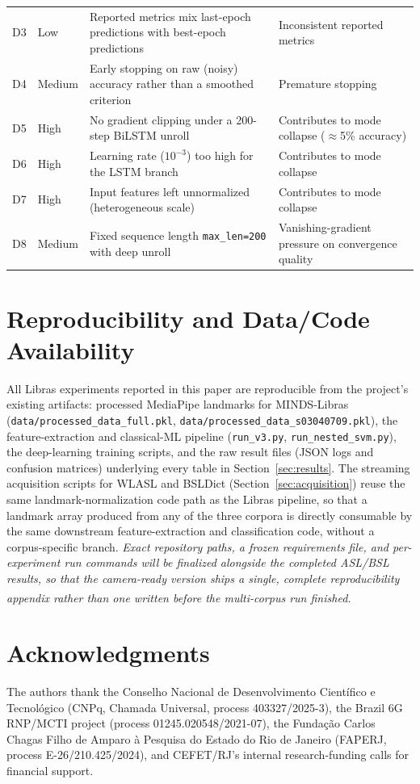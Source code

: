 \documentclass[journal]{IEEEtran}
\newcommand{\tbd}[1]{\textit{#1}\textsuperscript{\dag}}   %
\begin{document}
\begin{table}[t]
\begin{tabular}{clp{9.5cm}l}
D3 & Low & Reported metrics mix last-epoch predictions with best-epoch predictions & Inconsistent reported metrics \\
D4 & Medium & Early stopping on raw (noisy) accuracy rather than a smoothed criterion & Premature stopping \\
D5 & High & No gradient clipping under a 200-step BiLSTM unroll & Contributes to mode collapse ($\approx$5\% accuracy) \\
D6 & High & Learning rate ($10^{-3}$) too high for the LSTM branch & Contributes to mode collapse \\
D7 & High & Input features left unnormalized (heterogeneous scale) & Contributes to mode collapse \\
D8 & Medium & Fixed sequence length \texttt{max\_len=200} with deep unroll & Vanishing-gradient pressure on convergence quality \\
\bottomrule
\end{tabular}
\end{table}

\section{Reproducibility and Data/Code Availability}
\label{app:repro}
All Libras experiments reported in this paper are reproducible from the project's existing artifacts: processed MediaPipe landmarks for MINDS-Libras (\texttt{data/processed\_data\_full.pkl}, \texttt{data/processed\_data\_s03040709.pkl}), the feature-extraction and classical-ML pipeline (\texttt{run\_v3.py}, \texttt{run\_nested\_svm.py}), the deep-learning training scripts, and the raw result files (JSON logs and confusion matrices) underlying every table in Section~\ref{sec:results}. The streaming acquisition scripts for WLASL and BSLDict (Section~\ref{sec:acquisition}) reuse the same landmark-normalization code path as the Libras pipeline, so that a landmark array produced from any of the three corpora is directly consumable by the same downstream feature-extraction and classification code, without a corpus-specific branch. \tbd{Exact repository paths, a frozen requirements file, and per-experiment run commands will be finalized alongside the completed ASL/BSL results, so that the camera-ready version ships a single, complete reproducibility appendix rather than one written before the multi-corpus run finished.}

\section*{Acknowledgments}
The authors thank the Conselho Nacional de Desenvolvimento Científico e Tecnológico (CNPq, Chamada Universal, process 403327/2025-3), the Brazil 6G RNP/MCTI project (process 01245.020548/2021-07), the Fundação Carlos Chagas Filho de Amparo à Pesquisa do Estado do Rio de Janeiro (FAPERJ, process E-26/210.425/2024), and CEFET/RJ's internal research-funding calls for financial support.



\end{document}
